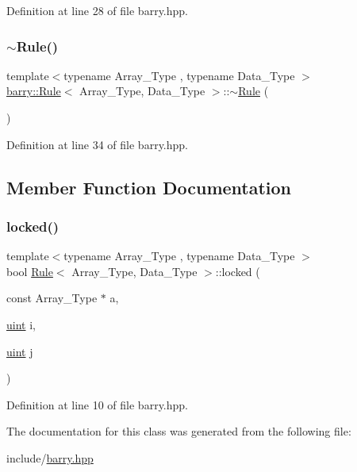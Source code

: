 Definition at line 28 of file barry.\+hpp.

\mbox{\label{classbarry_1_1_rule_a5b56209f553a6fe5b841395eec8e3101}} 
\subsubsection{\texorpdfstring{$\sim$\+Rule()}{~Rule()}}
{\footnotesize\ttfamily template$<$typename Array\+\_\+\+Type , typename Data\+\_\+\+Type $>$ \\
\hyperlink{classbarry_1_1_rule}{barry\+::\+Rule}$<$ Array\+\_\+\+Type, Data\+\_\+\+Type $>$\+::$\sim$\hyperlink{classbarry_1_1_rule}{Rule} (\begin{DoxyParamCaption}{ }\end{DoxyParamCaption})\hspace{0.3cm}{\ttfamily [inline]}}



Definition at line 34 of file barry.\+hpp.



\subsection{Member Function Documentation}
\mbox{\label{classbarry_1_1_rule_a0a9a115c6951a5c8de699d4ff9f69060}} 
\subsubsection{\texorpdfstring{locked()}{locked()}}
{\footnotesize\ttfamily template$<$typename Array\+\_\+\+Type , typename Data\+\_\+\+Type $>$ \\
bool \hyperlink{classbarry_1_1_rule}{Rule}$<$ Array\+\_\+\+Type, Data\+\_\+\+Type $>$\+::locked (\begin{DoxyParamCaption}\item[{const Array\+\_\+\+Type $\ast$}]{a,  }\item[{\hyperlink{namespacebarry_a11dfc53ddb4672278319aa04f1e09a6c}{uint}}]{i,  }\item[{\hyperlink{namespacebarry_a11dfc53ddb4672278319aa04f1e09a6c}{uint}}]{j }\end{DoxyParamCaption})\hspace{0.3cm}{\ttfamily [inline]}}



Definition at line 10 of file barry.\+hpp.



The documentation for this class was generated from the following file\+:\begin{DoxyCompactItemize}
\item 
include/\hyperlink{barry_8hpp}{barry.\+hpp}\end{DoxyCompactItemize}
